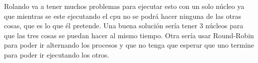 Rolando va a tener muchos problemas para ejecutar esto con un solo núcleo ya que mientras se este ejecutando el cpu no se podrá hacer ninguna de las otras cosas, que es lo que él
pretende. Una buena solución sería tener 3 núcleos para que las tres cosas se puedan hacer al mismo tiempo. Otra sería usar Round-Robin para poder ir alternando los procesos y 
que no tenga que esperar que uno termine para poder ir ejecutando los otros.